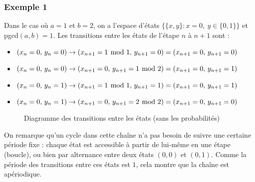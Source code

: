 \documentclass{article}
\begin{document}
\subsubsection*{Exemple 1}
Dans le cas où $a=1$ et $b=2$, on a l'espace d'états $\{\{x,y\}:x=0,\ y\in\{0,1\}\}$
et pgcd$(a,b)=1$. Les transitions entre les états de l'étape $n$ à $n+1$ sont :
\begin{itemize}
    \item $(x_n=0,\,y_n=0)\to(x_{n+1}=1\hspace{-.1cm}\mod 1,\,y_{n+1}=0)=(x_{n+1}=0,\,y_{n+1}=0)$
    \item $(x_n=0,\,y_n=0)\to(x_{n+1}=0,\,y_{n+1}=1\hspace{-.1cm}\mod 2)=(x_{n+1}=0,\,y_{n+1}=1)$
    \item $(x_n=0,\,y_n=1)\to(x_{n+1}=1\hspace{-.1cm}\mod 1,\,y_{n+1}=1)=(x_{n+1}=0,\,y_{n+1}=1)$
    \item $(x_n=0,\,y_n=1)\to(x_{n+1}=0,\,y_{n+1}=2\hspace{-.1cm}\mod 2)=(x_{n+1}=0,\,y_{n+1}=0)$
\end{itemize}
\begin{figure}[h]
    \centering
    \caption{Diagramme des transitions entre les états (sans les probabilités)}
\end{figure}

On remarque qu'un cycle dans cette chaîne n'a pas besoin de suivre une certaine 
période fixe : chaque état est accessible à partir de lui-même en une étape (boucle), 
ou bien par alternance entre deux états $(0,0)$ et $(0,1)$. Comme la période des 
transitions entre ces états est $1$, cela montre que la chaîne est apériodique.
\end{document}
